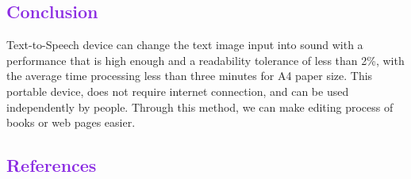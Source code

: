 \documentclass[a4paper]{article}
\begin{document}
\textcolor{BlueViolet}
{\section{Conclusion}}
\small
Text-to-Speech device can change the text image input into sound with a performance that is high enough and a readability tolerance of less than 2\%, with the average time processing less than three minutes for A4 paper size. This portable device, does not require internet connection, and can be used independently by people. Through this method, we can make editing process of books or web pages easier.

\textcolor{BlueViolet}
{\section{References}}
\end{document}
